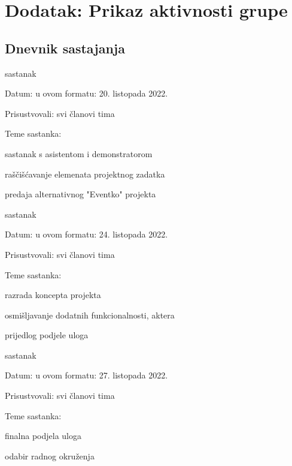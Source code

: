 \chapter*{Dodatak: Prikaz aktivnosti grupe}
		
		\section*{Dnevnik sastajanja}
		
		\begin{packed_enum}
			\item  sastanak
			
			\item[] \begin{packed_item}
				\item Datum: u ovom formatu: 20. listopada 2022.
				\item Prisustvovali: svi članovi tima
				\item Teme sastanka:
				\begin{packed_item}
					\item  sastanak s asistentom i demonstratorom
					\item  raščišćavanje elemenata projektnog zadatka
					\item  predaja alternativnog "Eventko" projekta
				\end{packed_item}
			\end{packed_item}
			
			\item  sastanak
			\item[] \begin{packed_item}
				\item Datum: u ovom formatu: 24. listopada 2022.
				\item Prisustvovali: svi članovi tima
				\item Teme sastanka:
				\begin{packed_item}
					\item  razrada koncepta projekta
					\item  osmišljavanje dodatnih funkcionalnosti, aktera
					\item  prijedlog podjele uloga
				\end{packed_item}
			\end{packed_item}
		
			\item  sastanak
			\item[] \begin{packed_item}
				\item Datum: u ovom formatu: 27. listopada 2022.
				\item Prisustvovali: svi članovi tima
				\item Teme sastanka:
				\begin{packed_item}
					\item  finalna podjela uloga
					\item  odabir radnog okruženja
				\end{packed_item}
			\end{packed_item}
		

\end{packed_enum}
